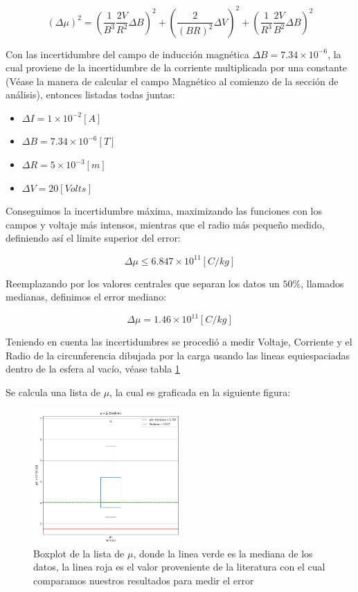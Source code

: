 \documentclass[a4paper,twocolumn,10pt]{article}
\begin{document}
$$
(\Delta \mu)^2 = (\frac{1}{B^3} \frac{2V}{R^2} \Delta B)^2 + (\frac{2}{(BR)^2} \Delta V)^2 + (\frac{1}{R^3} \frac{2V}{B^2} \Delta B)^2
$$

Con las incertidumbre del campo de inducción magnética $\Delta B = 7.34 \times 10^{-6}$, la cual proviene de la incertidumbre de la corriente multiplicada por una constante (Véase la manera de calcular el campo Magnético al comienzo de la sección de análisis), entonces listadas todas juntas:
\begin{itemize}
\item $\Delta I = 1 \times 10^{-2} [A]$
\item $\Delta B = 7.34 \times 10^{-6} [T] $
\item $\Delta R = 5 \times 10^{-3} [m]$
\item $\Delta V = 20 [Volts]$
\end{itemize}

Conseguimos la incertidumbre máxima, maximizando las funciones con los campos y voltaje más intensos, mientras que el radio más pequeño medido, definiendo así el limite superior del error:

$$ \Delta \mu \leq 6.847 \times 10^{11} [C/kg]$$

Reemplazando por los valores centrales que separan los datos un $50\%$, llamados medianas, definimos el error mediano:

$$ \Delta \mu = 1.46 \times 10^{11} [C/kg]$$

Teniendo en cuenta las incertidumbres se procedió a medir Voltaje, Corriente y el Radio de la circunferencia dibujada por la carga usando las lineas equiespaciadas dentro de la esfera al vacío, véase tabla \ref{fig:qmboxplot}

Se calcula una lista de $\mu$, la cual es graficada en la siguiente figura:

\begin{figure}[H]
    \centering
    \includegraphics[width=0.5\textwidth]{PlotQM/Dispersionqm_1.png}
    \caption{Boxplot de la lista de $\mu$, donde la linea verde es la mediana de los datos, la linea roja es el valor proveniente de la literatura con el cual comparamos nuestros resultados para medir el error}
    \label{fig:qmboxplot}
\end{figure}
\end{document}
